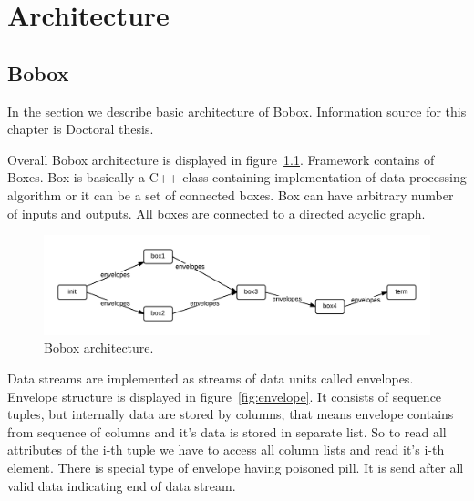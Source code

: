 \chapter{Architecture}

\section{Bobox}

In the section we describe basic architecture of Bobox. Information source for this chapter is Doctoral thesis\cite{faltthesis}. 

Overall Bobox architecture is displayed in figure~\ref{fig:bobox}. Framework contains of Boxes. Box is basically a C++ class containing implementation of data processing algorithm or it can be a set of connected boxes. Box can have arbitrary number of inputs and outputs. All boxes are connected to a directed acyclic graph.  

\begin{figure}[h!]
  \centering
    \includegraphics[width=1\textwidth]{bobox}

      \caption{Bobox architecture.}
          \label{fig:bobox}
\end{figure}

Data streams are implemented as streams of data units called envelopes. Envelope structure is displayed in figure~\ref{fig:envelope}. It consists of sequence tuples, but internally data are stored by columns, that means envelope contains from sequence of columns and it's data is stored in separate list. So to read all attributes of the i-th tuple we have to access all column lists and read it's i-th element. There is special type of envelope having poisoned pill. It is send after all valid data indicating end of data stream. 

